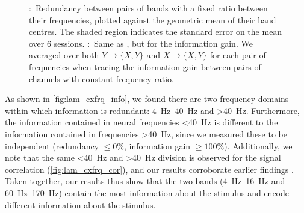 \begin{figure}[htbp]
{\protect{}:~Redundancy between pairs of bands with a fixed ratio between their frequencies, plotted against the geometric mean of their band centres.
The shaded region indicates the standard error on the mean over \num{6} sessions.
\protect{}:~Same as \protect{}, but for the information gain.
We averaged over both $Y \to \{X,Y\}$ and $X \to \{X,Y\}$ for each pair of frequencies when tracing the information gain between pairs of channels with constant frequency ratio.
}%
\label{fig:lam_cxfrq_info}
%
\end{figure}

As shown in \autoref{fig:lam_cxfrq_info}, we found there are two frequency domains within which information is redundant: \SIrange{4}{40}{Hz} and \SI{>40}{Hz}.
Furthermore, the information contained in neural frequencies \SI{<40}{Hz} is different to the information contained in frequencies \SI{>40}{Hz}, since we measured these to be independent (redundancy $\le0\%$, information gain $\ge100\%$).
Additionally, we note that the same \SI{<40}{Hz} and \SI{>40}{Hz} division is observed for the signal correlation (\autoref{fig:lam_cxfrq_cor}), and our results corroborate earlier findings \citep{Belitski2008}.
Taken together, our results thus show that the two bands (\SIrange{4}{16}{Hz} and \SIrange{60}{170}{Hz}) contain the most information about the stimulus and encode different information about the stimulus.

